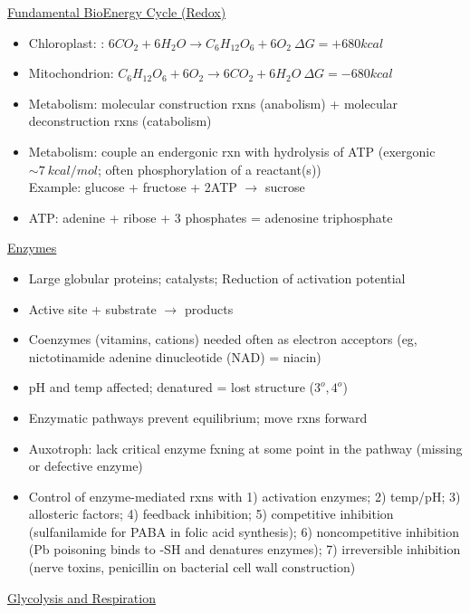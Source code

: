 \documentclass[12pt]{article}
\begin{document}
\underline{Fundamental BioEnergy Cycle (Redox)}
\begin{itemize}
	\item Chloroplast: : $6CO_2 + 6H_2O \rightarrow C_6H_{12}O_6 + 6O_2 \ \Delta G = +680 kcal$
	\item Mitochondrion: $C_6H_{12}O_6 + 6O_2 \rightarrow 6CO_2 + 6H_2O \ \Delta G = -680 kcal$
	\item Metabolism: molecular construction rxns (anabolism) + molecular deconstruction rxns (catabolism)
	\item Metabolism: couple an endergonic rxn with hydrolysis of ATP (exergonic $\sim 7 \ kcal/mol$; often phosphorylation of a reactant(s)) \\
	Example: glucose + fructose + 2ATP $ \rightarrow $ sucrose
	\item ATP: adenine + ribose + 3 phosphates = adenosine triphosphate
\end{itemize}
\underline{Enzymes}
\begin{itemize}
	\item Large globular proteins;  catalysts; Reduction of activation potential
	\item Active site + substrate $ \rightarrow $ products
	\item Coenzymes (vitamins, cations) needed often as electron acceptors (eg, nictotinamide adenine dinucleotide (NAD) = niacin)
	\item pH and temp affected; denatured = lost structure ($ 3^{o}, 4^{o}$)
	\item Enzymatic pathways prevent equilibrium; move rxns forward
	\item Auxotroph: lack critical enzyme fxning at some point in the pathway (missing or defective enzyme)
	\item Control of enzyme-mediated rxns with 1) activation enzymes; 2) temp/pH; 3) allosteric factors; 4) feedback inhibition; 5) competitive inhibition (sulfanilamide for PABA in folic acid synthesis); 6) noncompetitive inhibition (Pb poisoning binds to -SH and denatures enzymes); 7) irreversible inhibition (nerve toxins, penicillin on bacterial cell wall construction)
\end{itemize}
\underline{Glycolysis and Respiration}
\end{document}
